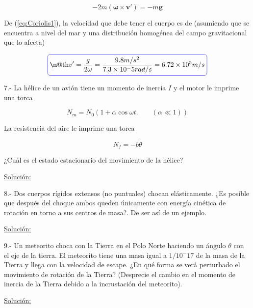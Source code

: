 \documentclass[a4paper,10pt]{article}
\makeatletter
\newcommand*{\boxcolor}{blue}
\renewcommand{\boxed}[1]{\textcolor{\boxcolor}{%
\tikz[baseline={([yshift=-1ex]current bounding box.center)}] \node [rectangle, minimum width=1ex,rounded corners,draw] {\normalcolor\m@th$\displaystyle#1$};}}
\makeatother
\begin{document}
\begin{equation}
 - 2m(\mathbf{\omega} \times \mathbf{v'}) = - m \mathbf{g}
 \label{eq:Coriolis1}
\end{equation}

De (\ref{eq:Coriolis1}), la velocidad que debe tener el cuerpo es de (asumiendo que se encuentra a nivel del mar
y una distribución homogénea del campo gravitacional que lo afecta)

\begin{equation}
 \boxed{ v' = \frac{g}{2\omega} = \frac{9.8 m/s^2}{7.3 \times 10^-5 rad/s} = 6.72 \times 10^5 m/s}
\end{equation}


\vspace{.3cm}

7.- La hélice de un avión tiene un momento de inercia $I$ y el motor le imprime una torca 

$$N_m = N_0 (1+\alpha \cos{\omega t}. \qquad (\alpha \ll 1))$$

La resistencia del aire le imprime una torca

$$N_f = -b\dot{\theta}$$

¿Cuál es el estado estacionario del movimiento de la hélice?

\vspace{.3cm}

\underline{Solución:}

\vspace{.3cm}

8.- Dos cuerpos rígidos extensos (no puntuales) chocan elásticamente. ¿Es posible que 
después del choque ambos queden únicamente con energía cinética de rotación en torno 
a sus centros de masa?. De ser así de un ejemplo.
\vspace{.3cm}

\underline{Solución:}

\vspace{.3cm}
9.- Un meteorito choca con la Tierra en el Polo Norte haciendo un ángulo $\theta$ con
el eje de la tierra. El meteorito tiene una masa igual a $1/10^-17$ de la masa de la 
Tierra y llega con la velocidad de escape. ¿En qué forma se verá perturbado el movimiento
de rotación de la Tierra? (Desprecie el cambio en el momento de inercia de la Tierra
debido a la incrustación del meteorito).
\vspace{.3cm}

\underline{Solución:}

\vspace{.3cm}
\end{document}
